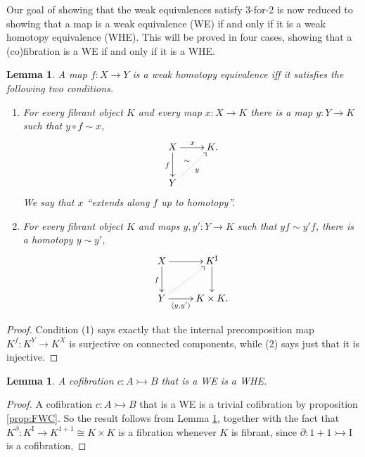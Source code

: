 \documentclass[12pt]{article}
\newcommand{\mono}{\ensuremath{\rightarrowtail}}
\newcommand{\ra}{\ensuremath{\rightarrow}}
\newcommand{\cof}{\ensuremath{\rightarrowtail}}
\newcommand{\I}{\ensuremath{\mathrm{I}}}
\newcommand{\del}{\ensuremath{\partial}}
\newtheorem{lemma}[theorem]{Lemma}
\theoremstyle{remark}
\theoremstyle{definition}
\begin{document}
Our goal of showing that the weak equivalences satisfy 3-for-2 is now reduced to showing that a map is a weak equivalence (WE) if and only if it is a weak homotopy equivalence (WHE). This will be proved in four cases, showing that a (co)fibration is a WE if and only if it is a WHE. 

\begin{lemma}\label{lem:WHEunwound}
A map $f : X\ra Y$ is a \emph{weak homotopy equivalence} iff it satisfies the following two conditions.
\begin{enumerate}
\item For every fibrant object $K$ and every map $x : X \ra K$ there is a map $y:Y\ra K$ such that $y\circ f \sim x$,
\[
\xymatrix{
X \ar[d]_{f} \ar[r]^{x}  & K.\\
Y \ar@{..>}[ru]_{y}^{\sim} &
}
\]
We say that $x$ ``extends along $f$ up to homotopy''.
\item For every fibrant object $K$ and maps $y, y' : Y \ra K$ such that $yf \sim y'f$, there is a homotopy $y\sim y'$,
\[
\xymatrix{
X \ar[d]_{f} \ar[r]  & K^\I\ar[d] \\
Y \ar@{..>}[ru] \ar[r]_-{\langle y,y'\rangle} & K\times K.
}
\]
\end{enumerate}
\end{lemma}
\begin{proof}
Condition (1) says exactly that the internal precomposition map $K^f : K^Y \ra K^X$ is surjective on connected components, while (2) says just that it is injective.
\end{proof}

\begin{lemma}\label{lemma:CofWEtoWHE}
A cofibration $c : A \mono B$ that is a WE is a WHE.
\end{lemma}

\begin{proof}
A cofibration $c : A \mono B$ that is a WE is a trivial cofibration by proposition \ref{prop:FWC}. 
So the result follows from Lemma \ref{lem:WHEunwound}, together with the fact that $K^\del: K^\I\ra K^{1+1}\cong K\times K$ is a fibration whenever $K$ is fibrant, since $\del : 1+1 \cof \I$ is a cofibration, 
\end{proof}
\end{document}
